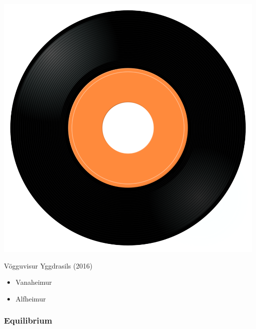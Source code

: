 \begin{minipage}[t]{0.25\textwidth}
\captionsetup{type=figure}
\includegraphics[width=\textwidth]{Images/cover.png}
\caption*{Vögguvisur Yggdrasils (2016)}
\end{minipage}
\begin{minipage}[t]{0.25\textwidth}\vspace{0pt}
\begin{itemize}[nosep,leftmargin=1em,labelwidth=*,align=left]
	\setlength{\itemsep}{0pt}
	\item Vanaheimur
	\item Alfheimur
\end{itemize}
\end{minipage}

\subsubsection{Equilibrium}

